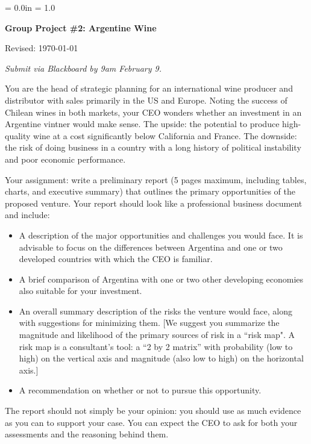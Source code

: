 \documentclass[letterpaper,12pt]{article}
\def\HeadName{Group Project \#2}
\begin{document}
\parindent = 0.0in
\parskip = 1.0\bigskipamount
\thispagestyle{empty}%
\Head

\centerline{\large \bf \HeadName:  Argentine Wine}%
\centerline{Revised:  \today}

\medskip
{\it Submit via Blackboard by 9am February 9.}
\medskip

You are the head of strategic planning for an international wine producer and distributor
with sales primarily in the US and Europe.
Noting the success of Chilean wines in both markets,
your CEO wonders whether an investment in an Argentine vintner would make sense.
The upside:  the potential to produce high-quality wine at a cost
significantly below California and France.
The downside:  the risk of doing business in a country
with a long history of political instability and 
poor economic performance.


Your assignment:  write a preliminary report (5 pages maximum,
including tables, charts, and executive summary) that outlines the primary opportunities of the proposed venture.  
Your report should look like a professional business document 
and include:  
%
\begin{itemize}%

\item A description of the major opportunities and challenges
you would face.  It is advisable to focus on the differences between
Argentina and one or two developed countries with which the CEO is familiar.

\item A brief comparison of Argentina with one or two other developing
economies also suitable for your investment.

\item An overall summary description of the risks the venture would
face, along with suggestions for minimizing them. 
[We suggest you summarize the magnitude and likelihood of the primary
sources of risk in a ``risk map".  A risk map is a consultant's tool:
a ``2 by 2 matrix'' with probability (low to high) on the
vertical axis and magnitude (also low to high) on the horizontal
axis.] 

\item A recommendation on whether or not to pursue this opportunity.  

\end{itemize}
%
The report should not simply be your opinion:  you should 
use as much evidence as you can to support your case.  
You can expect the CEO to ask for both your 
assessments and the reasoning behind them.  
\end{document}

